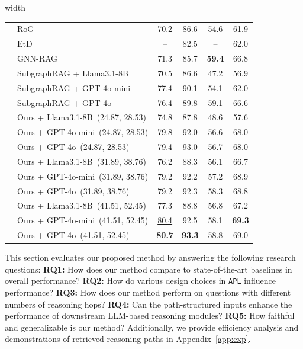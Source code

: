 \documentclass{article}
\theoremstyle{plain}
\theoremstyle{definition}
\theoremstyle{remark}
\newcommand{\tb}[1]{\textbf{#1}}
\newcommand{\proj}{\texttt{\scalebox{1.03}{R}APL}}
\begin{document}
\begin{table}
\begin{adjustbox}{width=\linewidth}
\begin{tabular}{clcccc}
  & RoG~\cite{luo2024rog} &    70.2 & 86.6 & 54.6 & 61.9 \\
  & EtD~\cite{liu2024explore} &    --     & 82.5 & --     & 62.0 \\
  & GNN-RAG~\cite{mavromatis2024gnn} &   71.3 & 85.7 & \tb{59.4} & 66.8 \\
  & SubgraphRAG + Llama3.1-8B~\cite{li2024simple} &  70.5 & 86.6 & 47.2 & 56.9 \\
  & SubgraphRAG + GPT-4o-mini~\cite{li2024simple} &  77.4 & 90.1 & 54.1 & 62.0 \\
  & SubgraphRAG + GPT-4o~\cite{li2024simple} &        76.4 & 89.8 & \underline{59.1} & 66.6 \\
\midrule
  & Ours + Llama3.1-8B~(24.87, 28.53) & 74.8 & 87.8 & 48.6 & 57.6 \\
  & Ours + GPT-4o-mini~(24.87, 28.53) & \cellcolor{red!15}79.8 & 92.0 & 56.6 & \cellcolor{red!15}68.0 \\
  & Ours + GPT-4o~(24.87, 28.53) & 79.4 & \cellcolor{red!15}\underline{93.0} & \cellcolor{red!15}56.7 & \cellcolor{red!15}68.0 \\ \midrule
  & Ours + Llama3.1-8B~(31.89, 38.76) & 76.2 & 88.3 & 56.1 & 66.7 \\
  & Ours + GPT-4o-mini~(31.89, 38.76) & \cellcolor{blue!10}79.2 & 92.2 & 57.2 & \cellcolor{blue!10}68.9 \\
  & Ours + GPT-4o~(31.89, 38.76) & \cellcolor{blue!10}79.2 & \cellcolor{blue!10}92.3 & \cellcolor{blue!10}58.3 & 68.8 \\ \midrule
  & Ours + Llama3.1-8B~(41.51, 52.45) & 77.3 & 88.8 & 56.8 & 67.2 \\
  & Ours + GPT-4o-mini~(41.51, 52.45) & \underline{80.4} & 92.5 & 58.1 & \cellcolor{green!15}\tb{69.3} \\
  & Ours + GPT-4o~(41.51, 52.45) & \cellcolor{green!15}\tb{80.7} & \cellcolor{green!15}\tb{93.3} & \cellcolor{green!15}58.8 & \underline{69.0} \\
\bottomrule
\end{tabular}
\end{adjustbox}
\vspace{-10pt}
\end{table}
This section evaluates our proposed method by answering the following research questions: \textbf{RQ1:} How does our method compare to state-of-the-art baselines in overall performance?
\textbf{RQ2:} How do various design choices in \proj{} influence performance?
\textbf{RQ3:} How does our method perform on questions with different numbers of reasoning hops?
\textbf{RQ4:} Can the path-structured inputs enhance the performance of downstream LLM-based reasoning modules?
\textbf{RQ5:} How faithful and generalizable is our method?
Additionally, we provide efficiency analysis and demonstrations of retrieved reasoning paths in Appendix~\ref{app:exp}.
\end{document}
